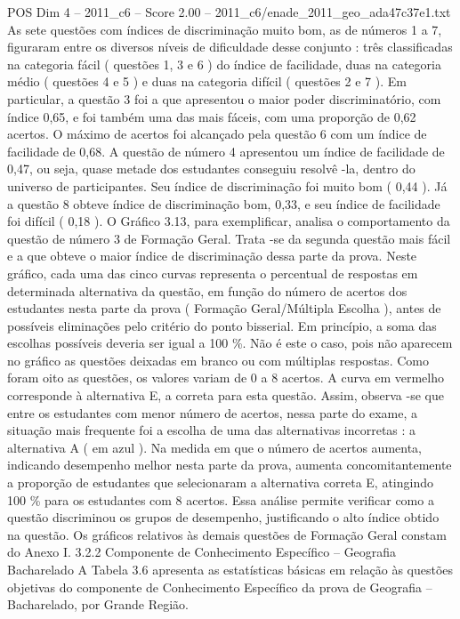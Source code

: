 \begin{textsample}{POS Dim 4 – 2011\_c6 – Score 2.00 – 2011\_c6/enade\_2011\_geo\_ada47c37e1.txt}
As sete questões com índices de discriminação muito bom, as de números 1 a 7, figuraram entre os diversos níveis de dificuldade desse conjunto : três classificadas na categoria fácil ( questões 1, 3 e 6 ) do índice de facilidade, duas na categoria médio ( questões 4 e 5 ) e duas na categoria difícil ( questões 2 e 7 ).
Em particular, a questão 3 foi a que apresentou o maior poder discriminatório, com índice 0,65, e foi também uma das mais fáceis, com uma proporção de 0,62 acertos.
O máximo de acertos foi alcançado pela questão 6 com um índice de facilidade de 0,68.
A questão de número 4 apresentou um índice de facilidade de 0,47, ou seja, quase metade dos estudantes conseguiu resolvê -la, dentro do universo de participantes.
Seu índice de discriminação foi muito bom ( 0,44 ).
Já a questão 8 obteve índice de discriminação bom, 0,33, e seu índice de facilidade foi difícil ( 0,18 ).
O Gráfico 3.13, para exemplificar, analisa o comportamento da questão de número 3 de Formação Geral.
Trata -se da segunda questão mais fácil e a que obteve o maior índice de discriminação dessa parte da prova.
Neste gráfico, cada uma das cinco curvas representa o percentual de respostas em determinada alternativa da questão, em função do número de acertos dos estudantes nesta parte da prova ( Formação Geral/Múltipla Escolha ), antes de possíveis eliminações pelo critério do ponto bisserial.
Em princípio, a soma das escolhas possíveis deveria ser igual a 100 \%.
Não é este o caso, pois não aparecem no gráfico as questões deixadas em branco ou com múltiplas respostas.
Como foram oito as questões, os valores variam de 0 a 8 acertos.
A curva em vermelho corresponde à alternativa E, a correta para esta questão.
Assim, observa -se que entre os estudantes com menor número de acertos, nessa parte do exame, a situação mais frequente foi a escolha de uma das alternativas incorretas : a alternativa A ( em azul ).
Na medida em que o número de acertos aumenta, indicando desempenho melhor nesta parte da prova, aumenta concomitantemente a proporção de estudantes que selecionaram a alternativa correta E, atingindo 100 \% para os estudantes com 8 acertos.
Essa análise permite verificar como a questão discriminou os grupos de desempenho, justificando o alto índice obtido na questão.
Os gráficos relativos às demais questões de Formação Geral constam do Anexo I. 3.2.2 Componente de Conhecimento Específico – Geografia Bacharelado A Tabela 3.6 apresenta as estatísticas básicas em relação às questões objetivas do componente de Conhecimento Específico da prova de Geografia – Bacharelado, por Grande Região.

\end{textsample}
